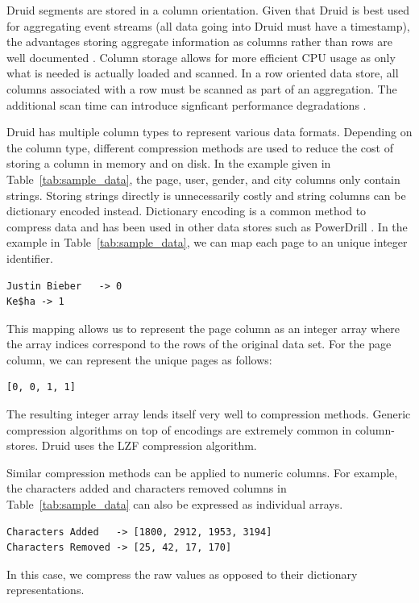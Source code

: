 \documentclass{acm_proc_article-sp}
\begin{document}
Druid segments are stored in a column orientation. Given that Druid is best
used for aggregating event streams (all data going into Druid must have a
timestamp), the advantages storing aggregate information as columns rather than
rows are well documented \cite{abadi2008column}. Column storage allows for more
efficient CPU usage as only what is needed is actually loaded and scanned. In a
row oriented data store, all columns associated with a row must be scanned as
part of an aggregation. The additional scan time can introduce signficant performance
degradations \cite{abadi2008column}.

Druid has multiple column types to represent various data formats. Depending on
the column type, different compression methods are used to reduce the cost of
storing a column in memory and on disk. In the example given in
Table~\ref{tab:sample_data}, the page, user, gender, and city columns only
contain strings. Storing strings directly is unnecessarily costly and string
columns can be dictionary encoded instead. Dictionary encoding is a common
method to compress data and has been used in other data stores such as
PowerDrill \cite{hall2012processing}. In the example in
Table~\ref{tab:sample_data}, we can map each page to an unique integer
identifier.
{\small\begin{verbatim}
Justin Bieber   -> 0
Ke$ha -> 1
\end{verbatim}}
This mapping allows us to represent the page column as an integer
array where the array indices correspond to the rows of the original
data set. For the page column, we can represent the unique
pages as follows:
{\small\begin{verbatim}
[0, 0, 1, 1]
\end{verbatim}}

The resulting integer array lends itself very well to
compression methods. Generic compression algorithms on top of encodings are
extremely common in column-stores. Druid uses the LZF \cite{liblzf2013} compression
algorithm.

Similar compression methods can be applied to numeric
columns. For example, the characters added and characters removed columns in
Table~\ref{tab:sample_data} can also be expressed as individual
arrays.
{\small\begin{verbatim}
Characters Added   -> [1800, 2912, 1953, 3194]
Characters Removed -> [25, 42, 17, 170]
\end{verbatim}}
In this case, we compress the raw values as opposed to their dictionary
representations.
\end{document}
